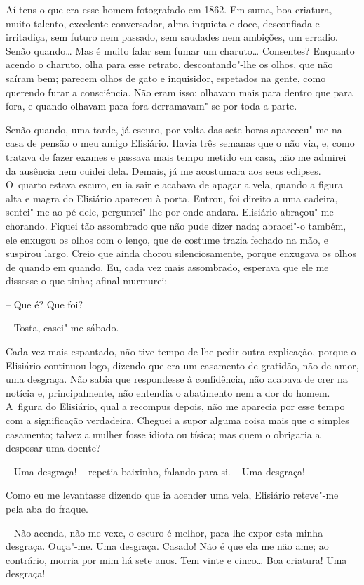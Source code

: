 Aí tens o que era esse homem fotografado em 1862. Em suma, boa criatura,
muito talento, excelente conversador, alma inquieta e doce, desconfiada
e irritadiça, sem futuro nem passado, sem saudades nem ambições, um
erradio. Senão quando\ldots{} Mas é muito falar sem fumar um charuto\ldots{}
Consentes? Enquanto acendo o charuto, olha para esse retrato,
descontando"-lhe os olhos, que não saíram bem; parecem olhos de gato e
inquisidor, espetados na gente, como querendo furar a consciência. Não
eram isso; olhavam mais para dentro que para fora, e quando olhavam para
fora derramavam"-se por toda a parte.

Senão quando, uma tarde, já escuro, por volta das sete horas apareceu"-me
na casa de pensão o meu amigo Elisiário. Havia três semanas que o não
via, e, como tratava de fazer exames e passava mais tempo metido em
casa, não me admirei da ausência nem cuidei dela. Demais, já me
acostumara aos seus eclipses. O~quarto estava escuro, eu ia sair e
acabava de apagar a vela, quando a figura alta e magra do Elisiário
apareceu à porta. Entrou, foi direito a uma cadeira, sentei"-me ao pé
dele, perguntei"-lhe por onde andara. Elisiário abraçou"-me chorando.
Fiquei tão assombrado que não pude dizer nada; abracei"-o também, ele
enxugou os olhos com o lenço, que de costume trazia fechado na mão, e
suspirou largo. Creio que ainda chorou silenciosamente, porque enxugava
os olhos de quando em quando. Eu, cada vez mais assombrado, esperava que
ele me dissesse o que tinha; afinal murmurei:

-- Que é? Que foi? 

-- Tosta, casei"-me sábado.

Cada vez mais espantado, não tive tempo de lhe pedir outra explicação,
porque o Elisiário continuou logo, dizendo que era um casamento de
gratidão, não de amor, uma desgraça. Não sabia que respondesse à
confidência, não acabava de crer na notícia e, principalmente, não
entendia o abatimento nem a dor do homem. A~figura do Elisiário, qual a
recompus depois, não me aparecia por esse tempo com a significação
verdadeira. Cheguei a supor alguma coisa mais que o simples casamento;
talvez a mulher fosse idiota ou tísica; mas quem o obrigaria a desposar
uma doente?

-- Uma desgraça! -- repetia baixinho, falando para si. -- Uma desgraça!

Como eu me levantasse dizendo que ia acender uma vela, Elisiário
reteve"-me pela aba do fraque.

-- Não acenda, não me vexe, o escuro é melhor, para lhe expor esta minha
desgraça. Ouça"-me. Uma desgraça. Casado! Não é que ela me não ame; ao
contrário, morria por mim há sete anos. Tem vinte e cinco\ldots{} Boa
criatura! Uma desgraça!

